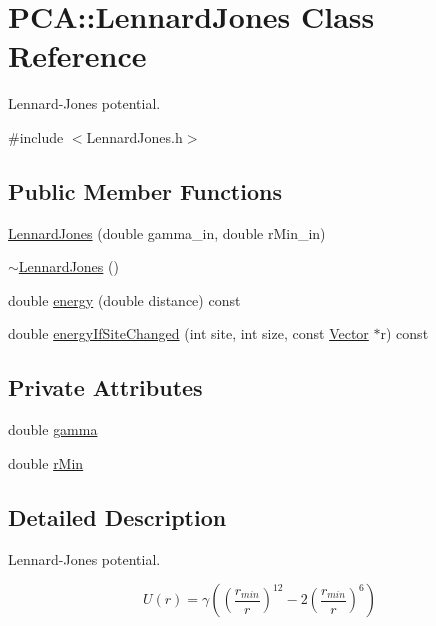\hypertarget{class_p_c_a_1_1_lennard_jones}{}\section{P\+CA\+:\+:Lennard\+Jones Class Reference}
\label{class_p_c_a_1_1_lennard_jones}


Lennard-\/\+Jones potential.  




{\ttfamily \#include $<$Lennard\+Jones.\+h$>$}

\subsection*{Public Member Functions}
\begin{DoxyCompactItemize}
\item 
\hyperlink{class_p_c_a_1_1_lennard_jones_a177de9041d696f41ac2b498973047759}{Lennard\+Jones} (double gamma\+\_\+in, double r\+Min\+\_\+in)
\item 
\hyperlink{class_p_c_a_1_1_lennard_jones_ac8acfe0ebd2e7f263d6561ab515f0028}{$\sim$\+Lennard\+Jones} ()
\item 
double \hyperlink{class_p_c_a_1_1_lennard_jones_a5021c95edaa07f8a82c685616b5e6114}{energy} (double distance) const
\item 
double \hyperlink{class_p_c_a_1_1_lennard_jones_a4ea7171851de5aec43842d769c54e4e9}{energy\+If\+Site\+Changed} (int site, int size, const \hyperlink{class_p_c_a_1_1_vector}{Vector} $\ast$r) const
\end{DoxyCompactItemize}
\subsection*{Private Attributes}
\begin{DoxyCompactItemize}
\item 
double \hyperlink{class_p_c_a_1_1_lennard_jones_ad28ea138038c2c43e9fd000752ea6130}{gamma}
\item 
double \hyperlink{class_p_c_a_1_1_lennard_jones_aa59f5f2bb7cf5c83a33a7f95d23ef4c8}{r\+Min}
\end{DoxyCompactItemize}


\subsection{Detailed Description}
Lennard-\/\+Jones potential. 

\[ U(r)= \gamma \left( \left(\frac{r_{min}}{r}\right)^{12} - 2 \left(\frac{r_{min}}{r}\right)^6\right)\] 

